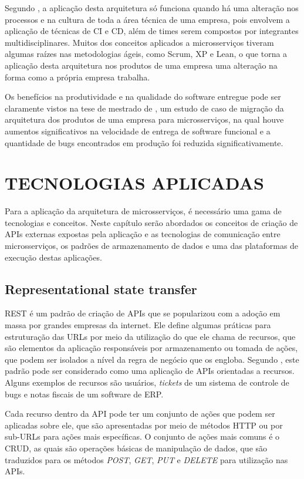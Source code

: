 Segundo , a aplicação desta arquitetura só funciona
quando há uma alteração nos processos e na cultura de toda a área técnica
de uma empresa, pois envolvem a aplicação de técnicas de \ac{CI} e \ac{CD},
além de times serem compostos por integrantes multidisciplinares. Muitos dos
conceitos aplicados a microsserviços tiveram algumas raízes nas metodologias
ágeis, como Scrum, XP e Lean, o que torna a aplicação desta arquitetura nos
produtos de uma empresa uma alteração na forma como a própria empresa trabalha.

Os benefícios na produtividade e na qualidade do software entregue pode
ser claramente vistos na tese de mestrado de , um estudo
de caso de migração da arquitetura dos produtos de uma empresa para
microsserviços, na qual houve aumentos significativos na velocidade de
entrega de software funcional e a quantidade de bugs encontrados em
produção foi reduzida significativamente.

\section{TECNOLOGIAS APLICADAS}

Para a aplicação da arquitetura de microsserviços, é necessário uma gama de
tecnologias e conceitos. Neste capítulo serão abordados os conceitos de criação
de APIs externas expostas pela aplicação e as tecnologias de comunicação entre
microsserviços, os padrões de armazenamento de dados e uma das plataformas de
execução destas aplicações.

\subsection{Representational state transfer}

\ac{REST} é um padrão de criação de \acp{API} que se popularizou com a
adoção em massa por grandes empresas da internet. Ele define algumas práticas
para estruturação das \acp{URL} por meio da utilização do que ele chama de
recursos, que são elementos da aplicação responsáveis por armazenamento ou
tomada de ações, que podem ser isolados a nível da regra de negócio que os
engloba. Segundo , este padrão pode ser considerado
como uma aplicação de \acp{API} orientadas a recursos. Alguns exemplos
de recursos são usuários, \emph{tickets} de um sistema de controle de bugs e
notas fiscais de um software de \ac{ERP}.

Cada recurso dentro da \ac{API} pode ter um conjunto de ações que podem ser
aplicadas sobre ele, que são apresentadas por meio de métodos \ac{HTTP} ou
por sub-\acp{URL} para ações mais específicas. O conjunto de ações mais
comuns é o \ac{CRUD}, as quais são operações básicas de manipulação de dados,
que são traduzidos para os métodos \emph{POST}, \emph{GET}, \emph{PUT} e
\emph{DELETE} para utilização nas \acp{API}.

